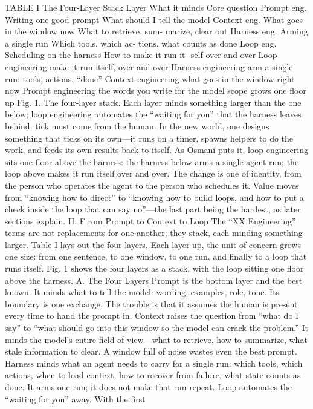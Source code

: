 \documentclass[conference]{IEEEtran}
\begin{document}
TABLE I
The Four-Layer Stack
Layer What it minds Core question
Prompt
eng.
Writing one
good prompt
What should I tell the
model
Context
eng.
What goes in the
window now
What to retrieve, sum-
marize, clear out
Harness
eng.
Arming a single
run
Which tools, which ac-
tions, what counts as
done
Loop eng. Scheduling on
the harness
How to make it run it-
self over and over
Loop engineering
make it run itself, over and over
Harness engineering
arm a single run: tools, actions, “done”
Context engineering
what goes in the window right now
Prompt engineering
the words you write for the model
scope grows
one
floor
up
Fig. 1. The four-layer stack. Each layer minds something larger than
the one below; loop engineering automates the “waiting for you” that
the harness leaves behind.
tick must come from the human. In the new world, one designs
something that ticks on its own—it runs on a timer, spawns
helpers to do the work, and feeds its own results back to itself.
As Osmani puts it, loop engineering sits one floor above the
harness: the harness below arms a single agent run; the loop
above makes it run itself over and over. The change is one of
identity, from the person who operates the agent to the person
who schedules it. Value moves from “knowing how to direct” to
“knowing how to build loops, and how to put a check inside the
loop that can say no”—the last part being the hardest, as later
sections explain.
II. F rom Prompt to Context to Loop
The “XX Engineering” terms are not replacements for one
another; they stack, each minding something larger. Table I lays
out the four layers.
Each layer up, the unit of concern grows one size: from one
sentence, to one window, to one run, and finally to a loop that
runs itself. Fig. 1 shows the four layers as a stack, with the loop
sitting one floor above the harness.
A. The Four Layers
Prompt is the bottom layer and the best known. It minds what
to tell the model: wording, examples, role, tone. Its boundary
is one exchange. The trouble is that it assumes the human is
present every time to hand the prompt in.
Context raises the question from “what do I say” to “what
should go into this window so the model can crack the problem.”
It minds the model’s entire field of view—what to retrieve, how
to summarize, what stale information to clear. A window full of
noise wastes even the best prompt.
Harness minds what an agent needs to carry for a single run:
which tools, which actions, when to load context, how to recover
from failure, what state counts as done. It arms one run; it does
not make that run repeat.
Loop automates the “waiting for you” away. With the first
\end{document}
